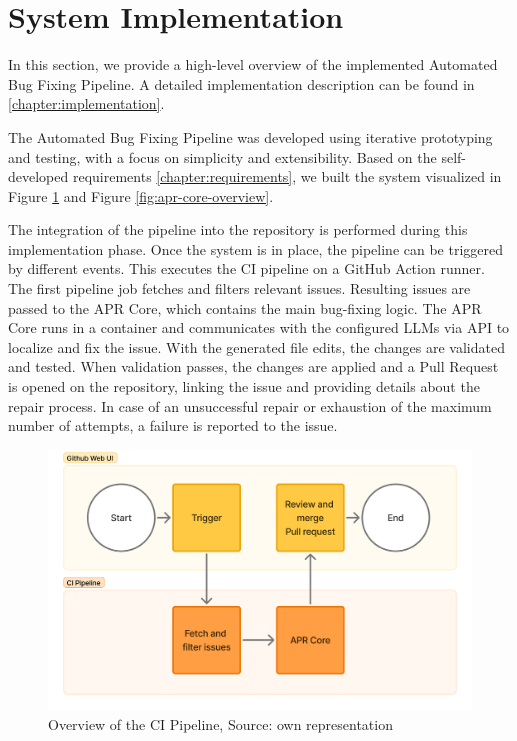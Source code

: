 \section{System Implementation}

In this section, we provide a high-level overview of the implemented Automated Bug Fixing Pipeline. A detailed implementation description can be found in \ref{chapter:implementation}.

The Automated Bug Fixing Pipeline was developed using iterative prototyping and testing, with a focus on simplicity and extensibility. Based on the self-developed requirements \ref{chapter:requirements}, we built the system visualized in Figure \ref{fig:high-level} and Figure \ref{fig:apr-core-overview}.

The integration of the pipeline into the repository is performed during this implementation phase. Once the system is in place, the pipeline can be triggered by different events. This executes the CI pipeline on a GitHub Action runner. The first pipeline job fetches and filters relevant issues. Resulting issues are passed to the APR Core, which contains the main bug-fixing logic. The APR Core runs in a container and communicates with the configured \acp{LLM} via API to localize and fix the issue. With the generated file edits, the changes are validated and tested. When validation passes, the changes are applied and a Pull Request is opened on the repository, linking the issue and providing details about the repair process. In case of an unsuccessful repair or exhaustion of the maximum number of attempts, a failure is reported to the issue.

\begin{figure}[H]
    \centering
    \includegraphics[width=1\textwidth]{images/flowcharts/overview.png}
    \caption{Overview of the CI Pipeline, Source: own representation}
    \label{fig:high-level}
\end{figure}


